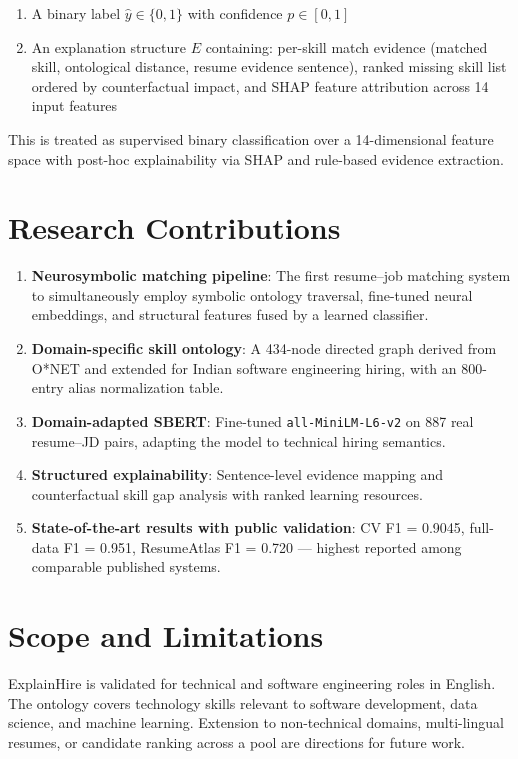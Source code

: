 \documentclass[12pt,a4paper]{report}
\begin{document}
\begin{enumerate}
  \item A binary label $\hat{y} \in \{0, 1\}$ with confidence $p \in [0,1]$
  \item An explanation structure $E$ containing: per-skill match evidence (matched skill, ontological distance, resume evidence sentence), ranked missing skill list ordered by counterfactual impact, and SHAP feature attribution across 14 input features
\end{enumerate}

This is treated as supervised binary classification over a 14-dimensional feature space with post-hoc explainability via SHAP and rule-based evidence extraction.

\section{Research Contributions}

\begin{enumerate}
  \item \textbf{Neurosymbolic matching pipeline}: The first resume--job matching system to simultaneously employ symbolic ontology traversal, fine-tuned neural embeddings, and structural features fused by a learned classifier.
  \item \textbf{Domain-specific skill ontology}: A 434-node directed graph derived from O*NET and extended for Indian software engineering hiring, with an 800-entry alias normalization table.
  \item \textbf{Domain-adapted SBERT}: Fine-tuned \texttt{all-MiniLM-L6-v2} on 887 real resume--JD pairs, adapting the model to technical hiring semantics.
  \item \textbf{Structured explainability}: Sentence-level evidence mapping and counterfactual skill gap analysis with ranked learning resources.
  \item \textbf{State-of-the-art results with public validation}: CV F1 = 0.9045, full-data F1 = 0.951, ResumeAtlas F1 = 0.720 --- highest reported among comparable published systems.
\end{enumerate}

\section{Scope and Limitations}

ExplainHire is validated for technical and software engineering roles in English. The ontology covers technology skills relevant to software development, data science, and machine learning. Extension to non-technical domains, multi-lingual resumes, or candidate ranking across a pool are directions for future work.
\end{document}
